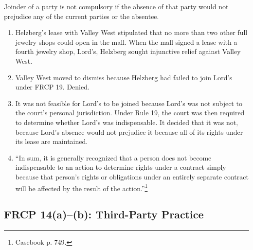 Joinder of a party is not compulsory if the absence of that party would not 
prejudice any of the current parties or the absentee.

\begin{enumerate}
    \item Helzberg's lease with Valley West stipulated that no more than two 
    other full jewelry shops could open in the mall. When the mall signed a 
    lease with a fourth jewelry shop, Lord's, Helzberg sought injunctive 
    relief against Valley West.
    \item Valley West moved to dismiss because Helzberg had failed to join 
    Lord's under FRCP 19. Denied.
    \item It was not feasible for Lord's to be joined because Lord's was not 
    subject to the court's personal jurisdiction. Under Rule 19, the court was 
    then required to determine whether Lord's was indispensable. It decided 
    that it was not, because Lord's absence would not prejudice it because all 
    of its rights under its lease are maintained.
    \item ``In sum, it is generally recognized that a person does not become 
    indispensable to an action to determine rights under a contract simply 
    because that person's rights or obligations under an entirely separate 
    contract will be affected by the result of the action.''\footnote{Casebook 
    p. 749.}
\end{enumerate}

\subsection{FRCP 14(a)--(b): Third-Party Practice}

